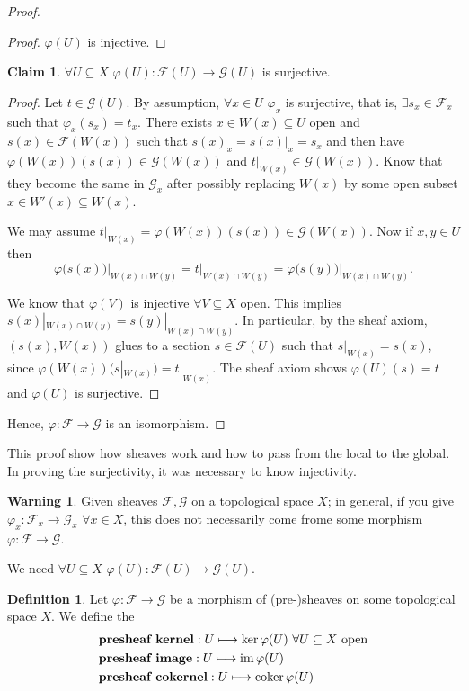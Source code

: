\documentclass[12pt]{article}
\DeclareMathOperator{\im}{im}
\DeclareMathOperator{\coker}{coker}
\theoremstyle{definition}
\newtheorem*{definition}{Definition}
\newtheorem*{warning}{Warning}
\newtheorem*{claim}{Claim}
\begin{document}
\begin{proof}
\begin{itemize}
\begin{proof}
$\varphi(U)$ is injective.
\end{proof}

\begin{claim}
$\forall U\subseteq X$ $\varphi(U):\mathcal{F}(U)\rightarrow\mathcal{G}(U)$ is surjective.
\end{claim}

\begin{proof}
Let $t\in\mathcal{G}(U)$. By assumption, $\forall x\in U$ $\varphi_x$ is surjective, that is, $\exists s_x\in\mathcal{F}_x$ such that $\varphi_x(s_x)=t_x$. There exists $x\in W(x)\subseteq U$ open and $s(x)\in\mathcal{F}(W(x))$ such that $s(x)_x=s(x)|_x=s_x$ and then have $\varphi(W(x))(s(x))\in\mathcal{G}(W(x))$ and $t|_{W(x)}\in\mathcal{G}(W(x))$. Know that they become the same in $\mathcal{G}_x$ after possibly replacing $W(x)$ by some open subset $x\in W'(x)\subseteq W(x)$.

We may assume $t|_{W(x)}=\varphi(W(x))(s(x))\in\mathcal{G}(W(x))$. Now if $x,y\in U$ then
\[\varphi\big(s(x)\big)\big|_{W(x)\cap W(y)}=t|_{W(x)\cap W(y)}=\varphi\big(s(y)\big)\big|_{W(x)\cap W(y)}.\]

We know that $\varphi(V)$ is injective $\forall V\subseteq X$ open. This implies $s(x)|_{W(x)\cap W(y)}=s(y)|_{W(x)\cap W(y)}$. In particular, by the sheaf axiom, $(s(x),W(x))$ glues to a section $s\in\mathcal{F}(U)$ such that $s|_{W(x)}=s(x)$, since $\varphi(W(x))(s|_{W(x)})=t|_{W(x)}$. The sheaf axiom shows $\varphi(U)(s)=t$ and $\varphi(U)$ is surjective.
\end{proof}
\end{itemize}
Hence, $\varphi:\mathcal{F}\rightarrow\mathcal{G}$ is an isomorphism.
\end{proof}
This proof show how sheaves work and how to pass from the local to the global. In proving the surjectivity, it was necessary to know injectivity.

\begin{warning}
Given sheaves $\mathcal{F},\mathcal{G}$ on a topological space $X$; in general, if you give $\varphi_x:\mathcal{F}_x\rightarrow\mathcal{G}_x$ $\forall x\in X$, this does not necessarily come frome some morphism $\varphi:\mathcal{F}\rightarrow\mathcal{G}$.

We need $\forall U\subseteq X$ $\varphi(U):\mathcal{F}(U)\rightarrow\mathcal{G}(U)$.
\end{warning}

\begin{definition}
Let $\varphi:\mathcal{F}\rightarrow\mathcal{G}$ be a morphism of (pre-)sheaves on some topological space $X$. We define the
\begin{align*}
&\text{\textbf{presheaf kernel}}:U\longmapsto\ker\varphi(U)\ \forall U\subseteq X\text{ open}\\
&\text{\textbf{presheaf image}}:U\longmapsto\im\varphi(U)\\
&\text{\textbf{presheaf cokernel}}:U\longmapsto\coker\varphi(U)
\end{align*}
\end{definition}
\end{document}

